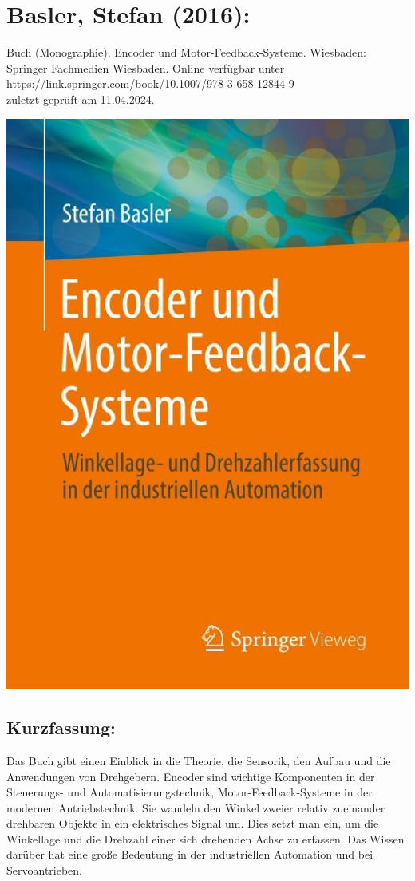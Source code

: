 \section*{Basler, Stefan (2016):}
Buch (Monographie). Encoder und Motor-Feedback-Systeme.
Wiesbaden: Springer Fachmedien Wiesbaden. Online verfügbar unter https://link.springer.com/book/10.1007/978-3-658-12844-9 \\
zuletzt geprüft am 11.04.2024.	\\
\begin{minipage}{0.5\textwidth}
	\includegraphics[width=\linewidth]{../Appendix/Literaturverzeichnis/img/Basler.jpg}
\end{minipage}
\hfill
\begin{minipage}{0.48\textwidth}
\subsection*{Kurzfassung:}
Das Buch gibt einen Einblick in die Theorie, die Sensorik, den Aufbau und die Anwendungen von Drehgebern. Encoder sind wichtige Komponenten in der Steuerungs- und Automatisierungstechnik, Motor-Feedback-Systeme in der modernen Antriebstechnik. Sie wandeln den Winkel zweier relativ zueinander drehbaren Objekte in ein elektrisches Signal um. Dies setzt man ein, um die Winkellage und die Drehzahl einer sich drehenden Achse zu erfassen. Das Wissen darüber hat eine große Bedeutung in der industriellen Automation und bei Servoantrieben.	
\end{minipage}
